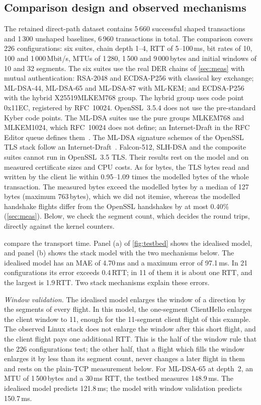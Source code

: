 \documentclass[preprint,12pt]{elsarticle}
\newcommand{\ms}{\,ms\xspace}
\newcommand{\Mbits}{\,Mbit/s\xspace}
\begin{document}
\subsection{Comparison design and observed mechanisms}
\label{sec:mech}
The retained direct-path dataset contains 5\,660 successful shaped transactions and 1\,300 unshaped baselines, 6\,960 transactions in total. The comparison covers 226 configurations: six suites, chain depth 1--4, RTT of 5--100\ms, bit rates of 10, 100 and 1\,000\Mbits, MTUs of 1\,280, 1\,500 and 9\,000\,bytes and initial windows of 10 and 32 segments. The six suites use the real DER chains of \cref{sec:meas} with mutual authentication: RSA-2048 and ECDSA-P256 with classical key exchange; ML-DSA-44, ML-DSA-65 and ML-DSA-87 with ML-KEM; and ECDSA-P256 with the hybrid X25519MLKEM768 group. The hybrid group uses code point 0x11EC, registered by RFC~10024. OpenSSL~3.5.4 does not use the pre-standard Kyber code points. The ML-DSA suites use the pure groups MLKEM768 and MLKEM1024, which RFC~10024 does not define; an Internet-Draft in the RFC Editor queue defines them~\cite{tlsmlkem}. The ML-DSA signature schemes of the OpenSSL TLS stack follow an Internet-Draft~\cite{tlsmldsa}. Falcon-512, SLH-DSA and the composite suites cannot run in OpenSSL~3.5 TLS. Their results rest on the model and on measured certificate sizes and CPU costs. As for bytes, the TLS bytes read and written by the client lie within 0.95--1.09 times the modelled bytes of the whole transaction. The measured bytes exceed the modelled bytes by a median of 127\,bytes (maximum 763\,bytes), which we did not itemise, whereas the modelled handshake flights differ from the OpenSSL handshakes by at most 0.40\% (\cref{sec:meas}). Below, we check the segment count, which decides the round trips, directly against the kernel counters.

 compare the transport time. Panel (a) of \cref{fig:testbed} shows the idealised model, and panel (b) shows the stack model with the two mechanisms below. The idealised model has an MAE of 4.70\ms and a maximum error of 97.1\ms. In 21 configurations its error exceeds 0.4\,RTT; in 11 of them it is about one RTT, and the largest is 1.9\,RTT. Two stack mechanisms explain these errors.

\emph{Window validation.} The idealised model enlarges the window of a direction by the segments of every flight. In this model, the one-segment ClientHello enlarges the client window to 11, enough for the 11-segment client flight of this example. The observed Linux stack does not enlarge the window after this short flight, and the client flight pays one additional RTT. This is the half of the window rule that the 226 configurations test; the other half, that a flight which fills the window enlarges it by less than its segment count, never changes a later flight in them and rests on the plain-TCP measurement below. For ML-DSA-65 at depth~2, an MTU of 1\,500\,bytes and a 30\ms RTT, the testbed measures 148.9\ms. The idealised model predicts 121.8\ms; the model with window validation predicts 150.7\ms.
\end{document}

